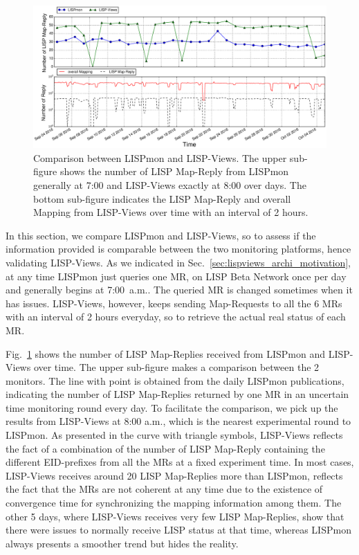 \begin{figure}[!t]
     \centering
     \includegraphics[width=1.1\textwidth]{Pics/LISPmon_comparison_all.eps}
     \caption{Comparison between LISPmon and LISP-Views. The upper
sub-figure shows the number of LISP Map-Reply from LISPmon generally at
7:00 and LISP-Views exactly at 8:00 over days. The bottom sub-figure
indicates the LISP Map-Reply and overall Mapping from LISP-Views over time with
an interval of 2 hours.}
     \label{lispmon_comparison}
\end{figure}

In this section, we compare LISPmon and LISP-Views, so to assess if the information provided is comparable between the two monitoring platforms, hence validating LISP-Views.  As we indicated in Sec.~\ref{sec:lispviews_archi_motivation}, at any time LISPmon just queries one MR, on LISP Beta Network once per day and generally begins at 7:00~a.m.. The queried MR is changed sometimes when it has issues. LISP-Views, however, keeps sending Map-Requests to all the 6 MRs with an interval of 2 hours everyday, so to retrieve the actual real status of each MR.

Fig.~\ref{lispmon_comparison} shows the number of LISP Map-Replies received from LISPmon and LISP-Views over time. The upper sub-figure makes a comparison between the 2 monitors. The line with point is obtained from the daily LISPmon publications, indicating the number of LISP Map-Replies returned by one MR in an uncertain time monitoring round every day. To facilitate the comparison, we pick up the results from LISP-Views at 8:00 a.m., which is the nearest experimental round to LISPmon. As presented in the curve with triangle symbols, LISP-Views reflects the fact of a combination of the number of LISP Map-Reply containing the different EID-prefixes from all the MRs at a fixed experiment time. In most cases, LISP-Views receives around 20 LISP Map-Replies more than LISPmon, reflects the fact that the MRs are not coherent at any time due to the existence of convergence time for synchronizing the mapping information among them. The other 5 days, where LISP-Views receives very few LISP Map-Replies, show that there were issues to normally receive LISP status at that time, whereas LISPmon always presents a smoother trend but hides the reality.

